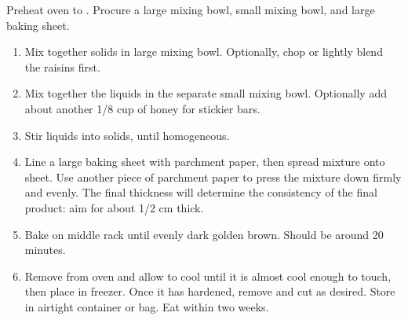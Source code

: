 \instructions
Preheat oven to . Procure a large mixing bowl, small mixing bowl, and large baking sheet.
\begin{enumerate}
    \item Mix together solids in large mixing bowl. Optionally, chop or lightly blend the raisins first.
    \item Mix together the liquids in the separate small mixing bowl. Optionally add about another 1/8 cup of honey for stickier bars.
    \item Stir liquids into solids, until homogeneous.
    \item Line a large baking sheet with parchment paper, then spread mixture onto sheet. Use another piece of parchment paper to press the mixture down firmly and evenly. The final thickness will determine the consistency of the final product: aim for about 1/2 cm thick.
    \item Bake on middle rack until evenly dark golden brown. Should be around 20 minutes.
    \item Remove from oven and allow to cool until it is almost cool enough to touch, then place in freezer. Once it has hardened, remove and cut as desired. Store in airtight container or bag. Eat within two weeks.
\end{enumerate}


